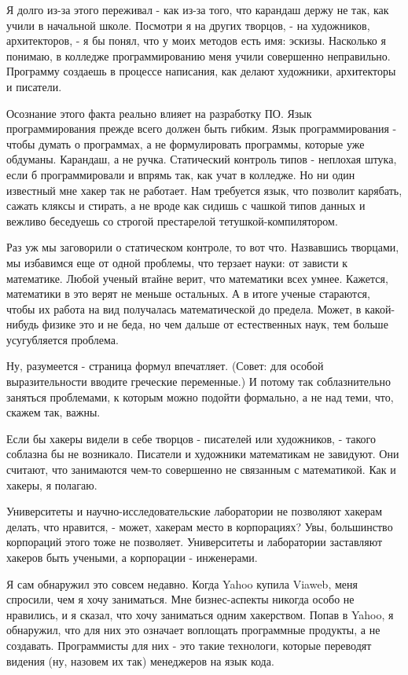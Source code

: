 \documentclass[ebook,12pt,oneside,openany]{memoir}
\begin{document}
Я долго из-за этого переживал - как из-за того, что карандаш держу не
так, как учили в начальной школе. Посмотри я на других творцов, - на
художников, архитекторов, - я бы понял, что у моих методов есть имя:
эскизы. Насколько я понимаю, в колледже программированию меня учили
совершенно неправильно. Программу создаешь в процессе написания, как
делают художники, архитекторы и писатели.

Осознание этого факта реально влияет на разработку ПО. Язык
программирования прежде всего должен быть гибким. Язык
программирования - чтобы думать о программах, а не формулировать
программы, которые уже обдуманы. Карандаш, а не ручка. Статический
контроль типов - неплохая штука, если б программировали и впрямь так,
как учат в колледже. Но ни один известный мне хакер так не работает.
Нам требуется язык, что позволит карябать, сажать кляксы и стирать, а
не вроде как сидишь с чашкой типов данных и вежливо беседуешь со
строгой престарелой тетушкой-компилятором.

Раз уж мы заговорили о статическом контроле, то вот что. Назвавшись
творцами, мы избавимся еще от одной проблемы, что терзает науки: от
зависти к математике. Любой ученый втайне верит, что математики всех
умнее. Кажется, математики в это верят не меньше остальных. А в итоге
ученые стараются, чтобы их работа на вид получалась математической до
предела. Может, в какой-нибудь физике это и не беда, но чем дальше от
естественных наук, тем больше усугубляется проблема.

Ну, разумеется - страница формул впечатляет. (Совет: для особой
выразительности вводите греческие переменные.) И потому так
соблазнительно заняться проблемами, к которым можно подойти формально,
а не над теми, что, скажем так, важны.

Если бы хакеры видели в себе творцов - писателей или художников, -
такого соблазна бы не возникало. Писатели и художники математикам не
завидуют. Они считают, что занимаются чем-то совершенно не связанным с
математикой. Как и хакеры, я полагаю.

Университеты и научно-исследовательские лаборатории не позволяют
хакерам делать, что нравится, - может, хакерам место в корпорациях?
Увы, большинство корпораций этого тоже не позволяет. Университеты и
лаборатории заставляют хакеров быть учеными, а корпорации -
инженерами.

Я сам обнаружил это совсем недавно. Когда Yahoo купила Viaweb, меня
спросили, чем я хочу заниматься. Мне бизнес-аспекты никогда особо не
нравились, и я сказал, что хочу заниматься одним хакерством. Попав в
Yahoo, я обнаружил, что для них это означает воплощать программные
продукты, а не создавать. Программисты для них - это такие технологи,
которые переводят видения (ну, назовем их так) менеджеров на язык
кода.
\end{document}
